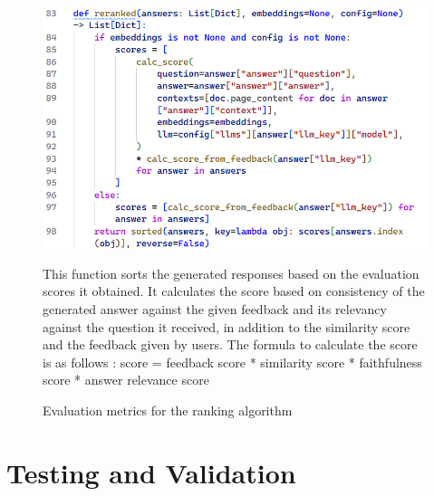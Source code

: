\begin{figure}[htbp]
    \centering
    \includegraphics[width=\linewidth]{./figures/ranking-algo.png}
    \caption{Evaluation metrics for the ranking algorithm}
    \begin{flushleft}
        \small This function sorts the generated responses based on the evaluation scores it obtained. It calculates the score based on consistency of the generated answer against the given feedback and its relevancy against the question it received, in addition to the similarity score and the feedback given by users. The formula to calculate the score is as follows :
        score = feedback score * similarity score * faithfulness score * answer relevance score
    \end{flushleft}
\end{figure}\newline
\newpage

\section{Testing and Validation}
